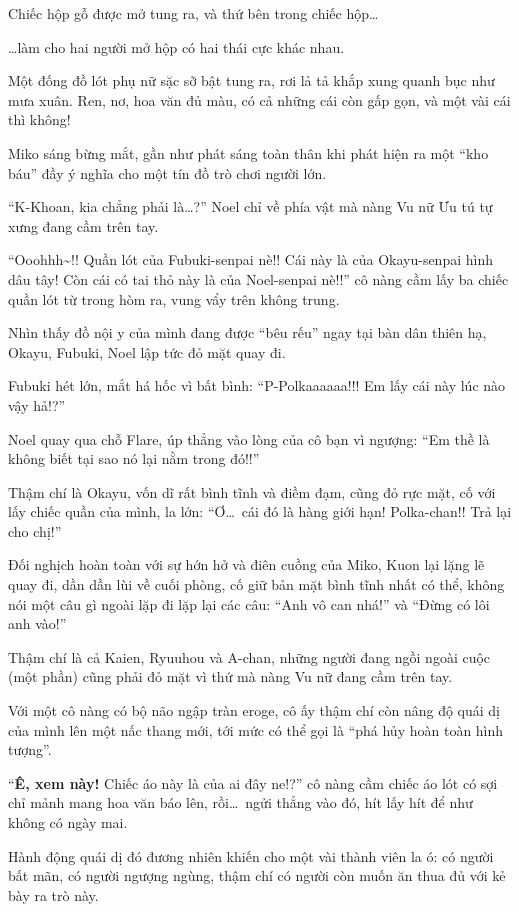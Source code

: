 \documentclass[../main.tex]{subfiles}
\begin{document}
Chiếc hộp gỗ được mở tung ra, và thứ bên trong chiếc hộp\dots

\dots làm cho hai người mở hộp có hai thái cực khác nhau.

Một đống đồ lót phụ nữ sặc sỡ bật tung ra, rơi lả tả khắp xung quanh bục như mưa xuân. Ren, nơ, hoa văn đủ màu, có cả những cái còn gấp gọn, và một vài cái thì không!

Miko sáng bừng mắt, gần như phát sáng toàn thân khi phát hiện ra một ``kho báu'' đầy ý nghĩa cho một tín đồ trò chơi người lớn.

``K-Khoan, kia chẳng phải là\dots?'' Noel chỉ về phía vật mà nàng Vu nữ Ưu tú tự xưng đang cầm trên tay.

``Ooohhh\~{}!! Quần lót của Fubuki-senpai nè!! Cái này là của Okayu-senpai hình dâu tây! Còn cái có tai thỏ này là của Noel-senpai nè!!'' cô nàng cầm lấy ba chiếc quần lót từ trong hòm ra, vung vẩy trên không trung.

Nhìn thấy đồ nội y của mình đang được ``bêu rếu'' ngay tại bàn dân thiên hạ, Okayu, Fubuki, Noel lập tức đỏ mặt quay đi.

Fubuki hét lớn, mắt há hốc vì bất bình: ``P-Polkaaaaaa!!! Em lấy cái này lúc nào vậy hả!?''

Noel quay qua chỗ Flare, úp thẳng vào lòng của cô bạn vì ngượng: ``Em thề là không biết tại sao nó lại nằm trong đó!!''

Thậm chí là Okayu, vốn dĩ rất bình tĩnh và điềm đạm, cũng đỏ rực mặt, cố với lấy chiếc quần của mình, la lớn: ``Ơ\dots\ cái đó là hàng giới hạn! Polka-chan!! Trả lại cho chị!''

Đối nghịch hoàn toàn với sự hớn hở và điên cuồng của Miko, Kuon lại lặng lẽ quay đi, dần dần lùi về cuối phòng, cố giữ bản mặt bình tĩnh nhất có thể, không nói một câu gì ngoài lặp đi lặp lại các câu: ``Anh vô can nhá!'' và ``Đừng có lôi anh vào!''

Thậm chí là cả Kaien, Ryuuhou và A-chan, những người đang ngồi ngoài cuộc (một phần) cũng phải đỏ mặt vì thứ mà nàng Vu nữ đang cầm trên tay.

Với một cô nàng có bộ não ngập tràn eroge, cô ấy thậm chí còn nâng độ quái dị của mình lên một nấc thang mới, tới mức có thể gọi là ``phá hủy hoàn toàn hình tượng''.

``\textbf{Ê, xem này!} Chiếc áo này là của ai đây ne!?'' cô nàng cầm chiếc áo lót có sợi chỉ mảnh mang hoa văn báo lên, rồi\dots\ ngửi thẳng vào đó, hít lấy hít để như không có ngày mai.

Hành động quái dị đó đương nhiên khiến cho một vài thành viên la ó: có người bất mãn, có người ngượng ngùng, thậm chí có người còn muốn ăn thua đủ với kẻ bày ra trò này.
\end{document}
